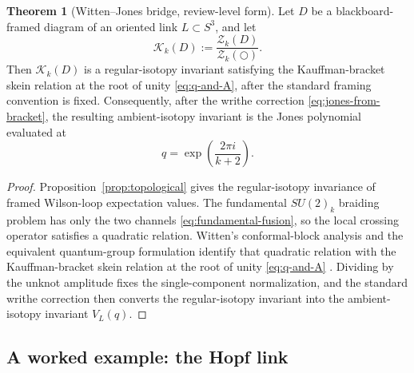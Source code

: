 \documentclass[11pt]{article}
\theoremstyle{definition}
\newtheorem{theorem}[equation]{Theorem}
\numberwithin{theorem}{section}
\numberwithin{equation}{section}
\begin{document}
\begin{theorem}[Witten--Jones bridge, review-level form]\label{thm:witten-jones-bridge}
Let $D$ be a blackboard-framed diagram of an oriented link $L \subset S^3$, and let
\begin{equation}\label{eq:normalized-CS-bracket}
\mathcal{K}_k(D)
:=
\frac{\mathcal{Z}_k(D)}{\mathcal{Z}_k(\bigcirc)}.
\end{equation}
Then $\mathcal{K}_k(D)$ is a regular-isotopy invariant satisfying the Kauffman-bracket skein relation at the root of unity \eqref{eq:q-and-A}, after the standard framing convention is fixed. Consequently, after the writhe correction \eqref{eq:jones-from-bracket}, the resulting ambient-isotopy invariant is the Jones polynomial evaluated at
\begin{equation}\label{eq:jones-root}
q = \exp\left(\frac{2\pi i}{k+2}\right).
\end{equation}
\end{theorem}

\begin{proof}
Proposition~\ref{prop:topological} gives the regular-isotopy invariance of framed Wilson-loop expectation values. The fundamental $SU(2)_k$ braiding problem has only the two channels \eqref{eq:fundamental-fusion}, so the local crossing operator satisfies a quadratic relation. Witten's conformal-block analysis and the equivalent quantum-group formulation identify that quadratic relation with the Kauffman-bracket skein relation at the root of unity \eqref{eq:q-and-A} \cite{Witten1989Jones,ReshetikhinTuraev1991}. Dividing by the unknot amplitude fixes the single-component normalization, and the standard writhe correction then converts the regular-isotopy invariant into the ambient-isotopy invariant $V_L(q)$.
\end{proof}

\subsection{A worked example: the Hopf link}
\end{document}
